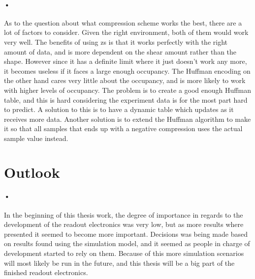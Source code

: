 \documentclass[a4paper, 12pt, openright, twoside]{report}
\begin{document}
\paragraph{•}
As to the question about what compression scheme works the best, there are a lot of factors to consider.
Given the right environment, both of them would work very well.
The benefits of using \gls{zs} is that it works perfectly with the right amount of data, and is more dependent on the shear amount rather than the shape.
However since it has a definite limit where it just doesn't work any more, it becomes useless if it faces a large enough occupancy.
The Huffman encoding on the other hand cares very little about the occupancy, and is more likely to work with higher levels of occupancy.
The problem is to create a good enough Huffman table, and this is hard considering the experiment data is for the most part hard to predict.
A solution to this is to have a dynamic table which updates as it receives more data.
Another solution is to extend the Huffman algorithm to make it so that all samples that ends up with a negative compression uses the actual sample value instead.

\section{Outlook}

\paragraph{•}
In the beginning of this thesis work, the degree of importance in regards to the development of the readout electronics was very low, but as more results where presented it seemed to become more important.
Decisions was being made based on results found using the simulation model, and it seemed as people in charge of development started to rely on them.
Because of this more simulation scenarios will most likely be run in the future, and this thesis will be a big part of the finished readout electronics.
\end{document}

